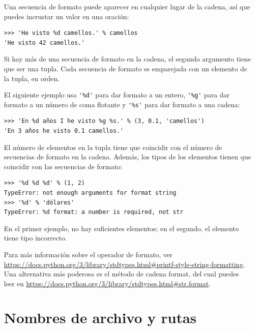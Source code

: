 \documentclass[10pt]{book}
\begin{document}
Una secuencia de formato puede aparecer en cualquier lugar de la cadena,
así que puedes incrustar un valor en una oración:

\begin{verbatim}
>>> 'He visto %d camellos.' % camellos
'He visto 42 camellos.'
\end{verbatim}
%
Si hay más de una secuencia de formato en la cadena,
el segundo argumento tiene que ser una tupla.  Cada secuencia de formato es
emparejada con un elemento de la tupla, en orden.

El siguiente ejemplo usa \verb"'%d'" para dar formato a un entero,
\verb"'%g'" para dar formato a un número de coma flotante y
\verb"'%s'" para dar formato a una cadena:

\begin{verbatim}
>>> 'En %d años I he visto %g %s.' % (3, 0.1, 'camellos')
'En 3 años he visto 0.1 camellos.'
\end{verbatim}
%
El número de elementos en la tupla tiene que coincidir con el número
de secuencias de formato en la cadena.  Además, los tipos de los
elementos tienen que coincidir con las secuencias de formato:

\begin{verbatim}
>>> '%d %d %d' % (1, 2)
TypeError: not enough arguments for format string
>>> '%d' % 'dólares'
TypeError: %d format: a number is required, not str
\end{verbatim}
%
En el primer ejemplo, no hay suficientes elementos; en el
segundo, el elemento tiene tipo incorrecto.

Para más información sobre el operador de formato, ver
\url{https://docs.python.org/3/library/stdtypes.html#printf-style-string-formatting}.  Una alternativa más poderosa es
el método de cadena format, del cual puedes leer en
\url{https://docs.python.org/3/library/stdtypes.html#str.format}.




\section{Nombres de archivo y rutas}
\label{paths}
\end{document}
